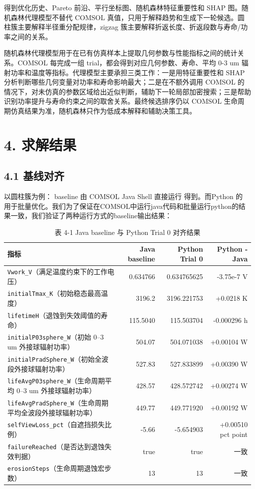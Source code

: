 \documentclass[
  a4paper,
]{ctexart}
\begin{document}
得到优化历史、Pareto 前沿、平行坐标图、随机森林特征重要性和 SHAP
图。随机森林代理模型不替代 COMSOL
真值，只用于解释趋势和生成下一轮候选。圆柱簇主要解释半径重分配规律，zigzag
簇主要解释折返长度、折返段数与寿命/功率之间的关系。

随机森林代理模型用于在已有仿真样本上提取几何参数与性能指标之间的统计关系。COMSOL
每完成一组 trial，都会得到对应几何参数、寿命、平均 0-3 um
辐射功率和温度等指标。代理模型主要承担三类工作：一是用特征重要性和 SHAP
分析判断哪些几何变量对功率和寿命影响最大；二是在不额外调用 COMSOL
的情况下，对未仿真的参数区域给出近似判断，辅助下一轮局部加密搜索；三是帮助识别功率提升与寿命约束之间的取舍关系。最终候选排序仍以
COMSOL 生命周期仿真结果为准，随机森林只作为低成本解释和辅助决策工具。

\section{4. 求解结果}\label{ux6c42ux89e3ux7ed3ux679c}

\subsection{4.1 基线对齐}\label{ux57faux7ebfux5bf9ux9f50}

以圆柱簇为例： baseline 由 COMSOL Java Shell 直接运行
 得到。而Python 的
用于批量优化。我们为了保证在COMSOL中运行java代码和批量运行python的结果一致，我们验证了两种运行方式的baseline输出结果：


\begin{table}[H]
\centering
\caption*{表 4-1 Java baseline 与 Python Trial 0 对齐结果}
\scriptsize
\begin{tabularx}{\textwidth}{Y r r r}
\toprule
指标 & Java baseline & Python Trial 0 & Python - Java \\
\midrule
\texttt{Vwork\_V}（满足温度约束下的工作电压） & 0.634766 & 0.634765625 & -3.75e-7 V \\
\texttt{initialTmax\_K}（初始稳态最高温度） & 3196.2 & 3196.221753 & +0.0218 K \\
\texttt{lifetimeH}（退蚀到失效阈值的寿命） & 115.5040 & 115.503704 & -0.000296 h \\
\texttt{initialP03sphere\_W}（初始 0--3 um 外接球辐射功率） & 504.07 & 504.071038 & +0.00104 W \\
\texttt{initialPradSphere\_W}（初始全波段外接球辐射功率） & 527.83 & 527.833899 & +0.00390 W \\
\texttt{lifeAvgP03sphere\_W}（生命周期平均 0--3 um 外接球辐射功率） & 428.57 & 428.572742 & +0.00274 W \\
\texttt{lifeAvgPradSphere\_W}（生命周期平均全波段外接球辐射功率） & 449.77 & 449.771920 & +0.00192 W \\
\texttt{selfViewLoss\_pct}（自遮挡损失比例） & -5.66 & -5.654903 & +0.00510 pct point \\
\texttt{failureReached}（是否达到退蚀失效判据） & true & true & 一致 \\
\texttt{erosionSteps}（生命周期退蚀宏步数） & 13 & 13 & 一致 \\
\bottomrule
\end{tabularx}
\end{table}
\end{document}
